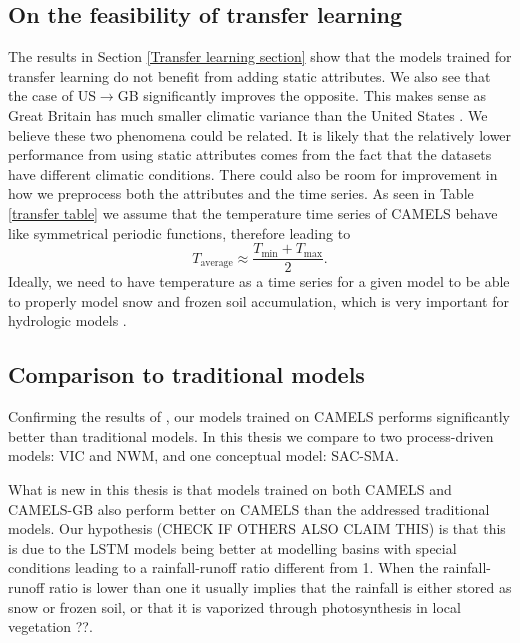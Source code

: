 \subsection{On the feasibility of transfer learning}
The results in Section \ref{Transfer learning section} show that the models trained 
for transfer learning do not benefit from adding static attributes. We also see 
that the case of US$\rightarrow$GB significantly improves the opposite. This makes 
sense as Great Britain has much smaller climatic variance than the United States 
\citationneeded. We believe these two phenomena could be related. It is likely 
that the relatively lower performance from using static attributes comes from the 
fact that the datasets have different climatic conditions. There could also be 
room for improvement in how we preprocess both the attributes and the time series. 
As seen in Table \ref{transfer table} we assume that the temperature time series 
of CAMELS behave like symmetrical periodic functions, therefore leading to 
\begin{equation}
T_\text{average} \approx  \frac{T_\text{min}+T_\text{max}}{2}.
\end{equation}
Ideally, we need to have temperature as a time series for a given model to be able 
to properly model snow and frozen soil accumulation, which is very important for 
hydrologic models \citationneeded. 
\subsection{Comparison to traditional models}
Confirming the results of \citet{lstm_second_paper,lstm_third_paper}, our models 
trained on CAMELS performs significantly better than traditional models. In this 
thesis we compare to two process-driven models: VIC and NWM, and one conceptual 
model: SAC-SMA. 

What is new in this thesis is that models trained on both CAMELS and CAMELS-GB 
also perform better on CAMELS than the addressed traditional models. Our hypothesis 
(CHECK IF OTHERS ALSO CLAIM THIS) \citationneeded is that this is due to the LSTM 
models being better at modelling basins with special conditions leading to 
a rainfall-runoff ratio different from 1. When the rainfall-runoff ratio is lower 
than one it usually implies that the rainfall is either stored as snow or frozen 
soil, or that it is vaporized through photosynthesis in local vegetation \citationneeded ??. 

